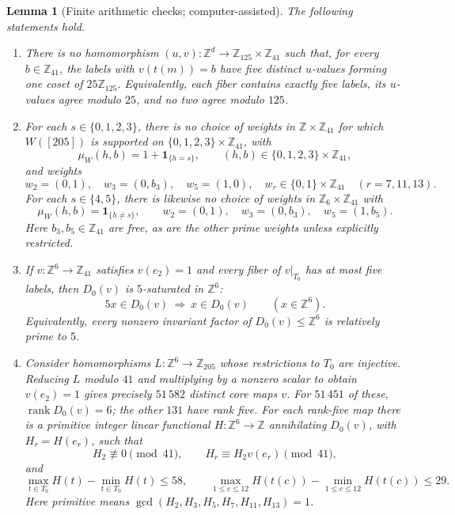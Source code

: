 \documentclass[10pt,a4paper]{amsart}
\newtheorem{lemma}{Lemma}
\newcommand{\Z}{\mathbb Z}
\newcommand{\one}{\mathbf 1}
\begin{document}
\begin{lemma}[Finite arithmetic checks; computer-assisted]\label{lem:205-computations}
The following statements hold.
\begin{enumerate}
\renewcommand{\theenumi}{\roman{enumi}}
\renewcommand{\labelenumi}{\textup{(\theenumi)}}
\item There is no homomorphism $(u,v):\Z^d\to\Z_{125}\times\Z_{41}$
such that, for every $b\in\Z_{41}$, the labels with $v(t(m))=b$ have
five distinct $u$-values forming one coset of $25\Z_{125}$.
Equivalently, each fiber contains exactly five labels, its $u$-values
agree modulo $25$, and no two agree modulo $125$.

\item For each $s\in\{0,1,2,3\}$, there is no choice of weights in
$\Z\times\Z_{41}$ for which $W([205])$ is supported on
$\{0,1,2,3\}\times\Z_{41}$, with
\[
 \mu_W(h,b)=1+\one_{\{h=s\}},
 \qquad (h,b)\in\{0,1,2,3\}\times\Z_{41},
\]
and weights
\[
 w_2=(0,1),\quad w_3=(0,b_3),\quad w_5=(1,0),\quad
 w_r\in\{0,1\}\times\Z_{41}\quad(r=7,11,13).
\]
For each $s\in\{4,5\}$, there is likewise no choice of weights in
$\Z_6\times\Z_{41}$ with
\[
 \mu_W(h,b)=\one_{\{h\ne s\}},\qquad
 w_2=(0,1),\quad w_3=(0,b_3),\quad w_5=(1,b_5).
\]
Here $b_3,b_5\in\Z_{41}$ are free, as are the other prime weights
unless explicitly restricted.

\item If $v:\Z^6\to\Z_{41}$ satisfies $v(e_2)=1$ and every
fiber of $v|_{T_0}$ has at most five labels, then $D_0(v)$ is
$5$-saturated in $\Z^6$:
\[
 5x\in D_0(v)\ \Longrightarrow\ x\in D_0(v)
 \qquad(x\in\Z^6).
\]
Equivalently, every nonzero invariant factor of $D_0(v)\le\Z^6$
is relatively prime to $5$.

\item Consider homomorphisms $L:\Z^6\to\Z_{205}$ whose
restrictions to $T_0$ are injective. Reducing $L$ modulo $41$ and
multiplying by a nonzero scalar to obtain $v(e_2)=1$ gives precisely
$51\,582$ distinct core maps $v$. For $51\,451$ of these,
$\operatorname{rank}D_0(v)=6$; the other $131$ have rank five.
For each rank-five map there is a primitive integer linear functional
$H:\Z^6\to\Z$ annihilating $D_0(v)$, with $H_r=H(e_r)$, such that
\[
 H_2\not\equiv0\pmod{41},\qquad H_r\equiv H_2v(e_r)\pmod{41},
\]
and
\[
 \max_{t\in T_0}H(t)-\min_{t\in T_0}H(t)\le58,
 \qquad
 \max_{1\le c\le12}H(t(c))-\min_{1\le c\le12}H(t(c))\le29.
\]
Here primitive means $\gcd(H_2,H_3,H_5,H_7,H_{11},H_{13})=1$.
\end{enumerate}
\end{lemma}
\end{document}
